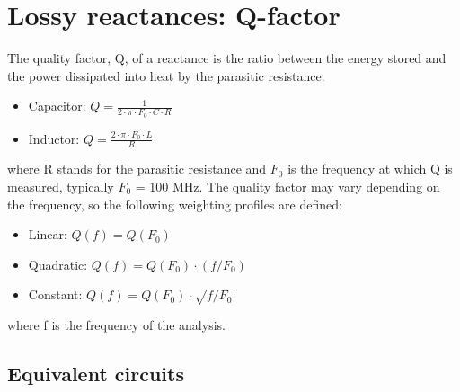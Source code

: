 \section{Lossy reactances: Q-factor}
The quality factor, Q, of a reactance is the ratio between the energy stored and the power dissipated into heat by the parasitic resistance.

\begin{itemize}
\item Capacitor: $Q = \frac{1}{2\cdot \pi \cdot F_0 \cdot C \cdot R}$
\item Inductor: $Q = \frac{2\cdot \pi \cdot F_0 \cdot L }{R}$ 
\end{itemize}

\noindent where R stands for the parasitic resistance and $F_0$ is the frequency at which Q is measured, typically $F_0$ = 100 MHz. 
The quality factor may vary depending on the frequency, so the following weighting profiles are defined:

\begin{itemize}
\item Linear: $Q(f) = Q(F_0)$ 
\item Quadratic: $Q(f) = Q(F_0)\cdot (f/F_0)$ 
\item Constant: $Q(f) = Q(F_0)\cdot \sqrt{f/F_0}$ 
\end{itemize}

\noindent where f is the frequency of the analysis.


\subsection{Equivalent circuits}

